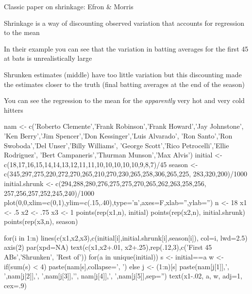 Classic paper on shrinkage: Efron \& Morris~\cite{efr77sti}
\bi
\item Shrinkage is a way of discounting observed variation that accounts for regression to the mean
\item In their example you can see that the variation in batting averages for the first 45 at bats is
  unrealistically large
\item Shrunken estimates (middle) have too little variation but this discounting made the estimates closer
  to the truth (final batting averages at the end of the season)
\item You can see the regression to the mean for the \emph{apparently}
  very hot and very cold hitters
\ei
\begin{Schunk}
\begin{Sinput}
nam <- c('Roberto Clemente','Frank Robinson','Frank Howard','Jay Johnstone',
  	 'Ken Berry','Jim Spencer','Don Kessinger','Luis Alvarado',
		 'Ron Santo','Ron Swoboda','Del Unser','Billy Williams',
		 'George Scott','Rico Petrocelli','Ellie Rodriguez',
		 'Bert Campaneris','Thurman Munson','Max Alvis')
initial <- c(18,17,16,15,14,14,13,12,11,11,10,10,10,10,10,9,8,7)/45
season  <- c(345,297,275,220,272,270,265,210,270,230,265,258,306,265,225,
             283,320,200)/1000
initial.shrunk <- c(294,288,280,276,275,275,270,265,262,263,258,256,
                    257,256,257,252,245,240)/1000
plot(0,0,xlim=c(0,1),ylim=c(.15,.40),type='n',axes=F,xlab='',ylab='')
n  <- 18
x1 <- .5
x2 <- .75
x3 <- 1
points(rep(x1,n), initial)
points(rep(x2,n), initial.shrunk)
points(rep(x3,n), season)

for(i in 1:n) lines(c(x1,x2,x3),c(initial[i],initial.shrunk[i],season[i]),
                    col=i, lwd=2.5)
axis(2)
par(xpd=NA)
text(c(x1,x2+.01, x2+.25),rep(.12,3),c('First 45 ABs','Shrunken\nEstimates',
     'Rest of\nSeason'))
for(a in unique(initial)) {
  s <- initial==a
  w <- if(sum(s) < 4) paste(nam[s],collapse=', ') else {
	j <- (1:n)[s]
	paste(nam[j[1]],', ',nam[j[2]],', ',nam[j[3]],'\n',
		  nam[j[4]],', ',nam[j[5]],sep='')
  }
  text(x1-.02, a, w, adj=1, cex=.9)
}
\end{Sinput}
\begin{figure}[htbp]


\end{figure}
\end{Schunk}

